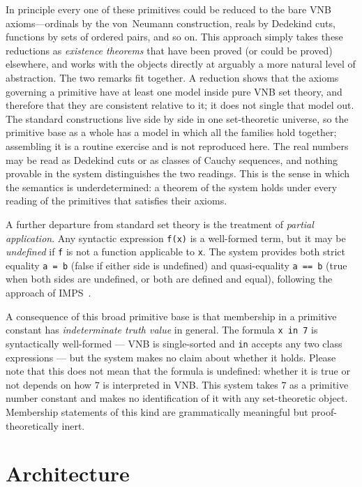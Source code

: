 In principle every one of these primitives could be reduced to the bare
VNB axioms---ordinals by the von~Neumann construction, reals by Dedekind
cuts, functions by sets of ordered pairs, and so on.  This approach
simply takes these reductions as \emph{existence theorems} that
have been proved (or could be proved) elsewhere, and works with the
objects directly at arguably a more natural level of abstraction.
The two remarks fit together.  A reduction shows that the axioms
governing a primitive have at least one model inside pure VNB set
theory, and therefore that they are consistent relative to it; it does
not single that model out.  The standard constructions live side by
side in one set-theoretic universe, so the primitive base as a whole
has a model in which all the families hold together; assembling it is
a routine exercise and is not reproduced here.  The real numbers may be read as Dedekind
cuts or as classes of Cauchy sequences, and nothing provable in the
system distinguishes the two readings.  This is the sense in which the
semantics is underdetermined: a theorem of the system holds under every
reading of the primitives that satisfies their axioms.

A further departure from standard set theory is the treatment of
\emph{partial application}.  Any syntactic expression \texttt{f(x)}
is a well-formed term, but it may be \emph{undefined} if \texttt{f} is
not a function applicable to \texttt{x}.  The system provides both
strict equality \texttt{a = b} (false if either side is undefined) and
quasi-equality \texttt{a == b} (true when both sides are undefined,
or both are defined and equal), following the approach of IMPS~\cite{IMPS}.

A consequence of this broad primitive base is that membership in a
primitive constant has \emph{indeterminate truth value} in general.
The formula \texttt{x in 7} is syntactically well-formed --- VNB is
single-sorted and \texttt{in} accepts any two class expressions ---
but the system makes no claim about whether it holds. Please note that
this does not mean that the formula is undefined: whether it is true
or not depends on how $7$ is interpreted in VNB. This system
takes $7$ as a primitive number constant and makes no identification
of it with any set-theoretic object.  Membership statements of this
kind are grammatically meaningful but proof-theoretically inert.

\section{Architecture}
\label{sec:architecture}

